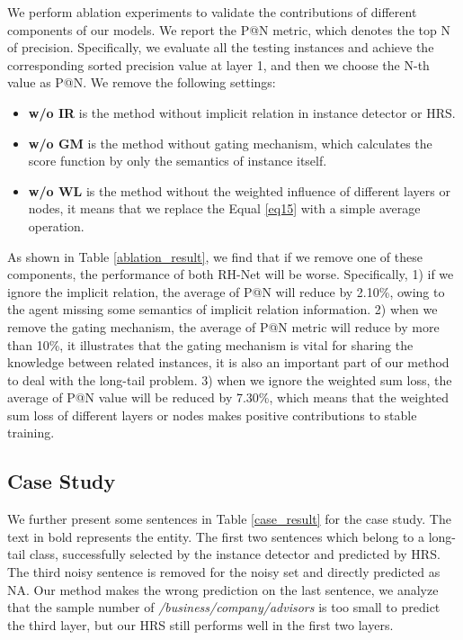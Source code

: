 \documentclass{article}
\begin{document}
We perform ablation experiments to validate the contributions of different components of our models. We report the P@N metric, which denotes the top N of precision. Specifically, we evaluate all the testing instances and achieve the corresponding sorted precision value at layer 1, and then we choose the N-th value as P@N. We remove the following settings: 
\begin{itemize}
    
    \item \textbf{w/o IR} is the method without implicit relation in instance detector or HRS.
    
    \item \textbf{w/o GM} is the method without gating mechanism, which calculates the score function by only the semantics of instance itself.
    
    \item \textbf{w/o WL} is the method without the weighted influence of different layers or nodes, it means that we replace the Equal \ref{eq15} with a simple average operation.
\end{itemize}

As shown in Table \ref{ablation_result}, we find that if we remove one of these components, the performance of both RH-Net will be worse. Specifically, 1) if we ignore the implicit relation, the average of P@N will reduce by 2.10\%, owing to the agent missing some semantics of implicit relation information. 2) when we remove the gating mechanism, the average of P@N metric will reduce by more than 10\%, it illustrates that the gating mechanism is vital for sharing the knowledge between related instances, it is also an important part of our method to deal with the long-tail problem. 3) when we ignore the weighted sum loss, the average of P@N value will be reduced by 7.30\%, which means that the weighted sum loss of different layers or nodes makes positive contributions to stable training.

\subsection{Case Study}

We further present some sentences in Table \ref{case_result} for the case study. The text in bold represents the entity. The first two sentences which belong to a long-tail class, successfully selected by the instance detector and predicted by HRS. The third noisy sentence is removed for the noisy set and directly predicted as NA. Our method makes the wrong prediction on the last sentence, we analyze that the sample number of \textit{/business/company/advisors} is too small to predict the third layer, but our HRS still performs well in the first two layers.
\end{document}
